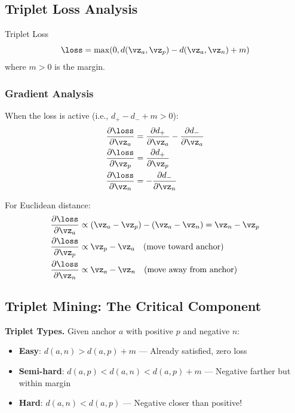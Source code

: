 \subsection{Triplet Loss Analysis}

\begin{mathresult}{Triplet Loss}
\begin{equation}
\loss = \max(0, d(\vz_a, \vz_p) - d(\vz_a, \vz_n) + m)
\end{equation}
where $m > 0$ is the margin.
\end{mathresult}

\subsubsection{Gradient Analysis}

When the loss is active (i.e., $d_+ - d_- + m > 0$):
\begin{align}
\frac{\partial \loss}{\partial \vz_a} &= \frac{\partial d_+}{\partial \vz_a} - \frac{\partial d_-}{\partial \vz_a} \\
\frac{\partial \loss}{\partial \vz_p} &= \frac{\partial d_+}{\partial \vz_p} \\
\frac{\partial \loss}{\partial \vz_n} &= -\frac{\partial d_-}{\partial \vz_n}
\end{align}

For Euclidean distance:
\begin{align}
\frac{\partial \loss}{\partial \vz_a} &\propto (\vz_a - \vz_p) - (\vz_a - \vz_n) = \vz_n - \vz_p \\
\frac{\partial \loss}{\partial \vz_p} &\propto \vz_p - \vz_a \quad \text{(move toward anchor)} \\
\frac{\partial \loss}{\partial \vz_n} &\propto \vz_a - \vz_n \quad \text{(move away from anchor)}
\end{align}

\subsection{Triplet Mining: The Critical Component}

\textbf{Triplet Types.} Given anchor $a$ with positive $p$ and negative $n$:
\begin{itemize}
    \item \textbf{Easy}: $d(a,n) > d(a,p) + m$ — Already satisfied, zero loss
    \item \textbf{Semi-hard}: $d(a,p) < d(a,n) < d(a,p) + m$ — Negative farther but within margin
    \item \textbf{Hard}: $d(a,n) < d(a,p)$ — Negative closer than positive!
\end{itemize}

